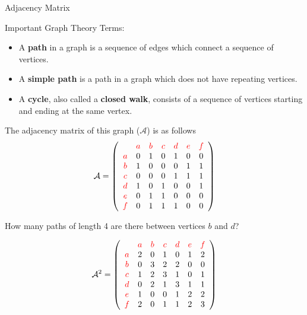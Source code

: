 \documentclass[]{report}
\begin{document}

{Adjacency Matrix}

Important Graph Theory Terms:\\
\begin{itemize}
\item A \textbf{path} in a graph is a sequence of edges which connect a sequence of vertices. 

\item A \textbf{simple path} is a path in a graph which does not have repeating vertices.

\item A \textbf{cycle}, also called a \textbf{closed walk}, consists of a sequence of vertices starting and ending at the same vertex.
\end{itemize}


The adjacency matrix of this graph ($\mathcal{A}$) is as follows
\[
\mathcal{A} = 
\left( 
\begin{array}{ccccccc}
&{\color{red}{a}}&{\color{red}{b}}
&{\color{red}{c}}&{\color{red}{d}}
&{\color{red}{e}}&{\color{red}{f}}
\\
{\color{red}{a}} & 0 & 1 & 0 & 1 & 0 & 0\\
{\color{red}{b}} & 1 & 0 & 0 & 0 & 1 & 1\\
{\color{red}{c}} & 0 & 0 & 0 & 1 & 1 & 1\\
{\color{red}{d}} & 1 & 0 & 1 & 0 & 0 & 1\\
{\color{red}{e}} & 0 & 1 & 1 & 0 & 0 & 0\\
{\color{red}{f}} & 0 & 1 & 1 & 1 & 0 & 0\\
\end{array} 
\right) \]



How many paths of length 4 are there between vertices $b$ and $d$?

\[
\mathcal{A}^2 = 
\left( 
\begin{array}{ccccccc}
&{\color{red}{a}}&{\color{red}{b}}
&{\color{red}{c}}&{\color{red}{d}}
&{\color{red}{e}}&{\color{red}{f}}
\\
{\color{red}{a}} & 2 & 0 & 1& 0 & 1 & 2\\
{\color{red}{b}} & 0 & 3 & 2& 2 & 0 & 0\\
{\color{red}{c}} & 1 & 2 & 3& 1 & 0 & 1\\
{\color{red}{d}} & 0 & 2 & 1& 3 & 1 & 1\\
{\color{red}{e}} & 1 & 0 & 0& 1 & 2 & 2\\
{\color{red}{f}} & 2 & 0 & 1& 1 & 2 & 3\\
\end{array}
\right)
\]
\end{document}
